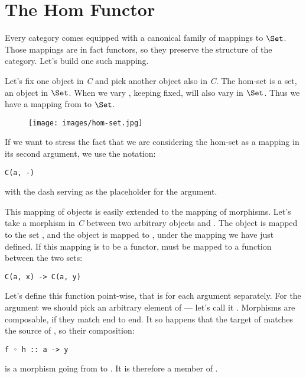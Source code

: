 \section{The Hom Functor}\label{the-hom-functor}

Every category comes equipped with a canonical family of mappings to
$\Set$. Those mappings are in fact functors, so they preserve the
structure of the category. Let's build one such mapping.

Let's fix one object  in \emph{C} and pick another object
 also in \emph{C}. The hom-set  is a set, an
object in $\Set$. When we vary , keeping 
fixed,  will also vary in $\Set$. Thus we have a
mapping from  to $\Set$.

\begin{figure}[H]
\centering
\texttt{[image: images/hom-set.jpg]}
\end{figure}

\noindent
If we want to stress the fact that we are considering the hom-set as a
mapping in its second argument, we use the notation:

\begin{Verbatim}[commandchars=\\\{\}]
C(a, -)
\end{Verbatim}
with the dash serving as the placeholder for the argument.

This mapping of objects is easily extended to the mapping of morphisms.
Let's take a morphism  in \emph{C} between two arbitrary
objects  and . The object  is mapped to
the set , and the object  is mapped to
, under the mapping we have just defined. If this
mapping is to be a functor,  must be mapped to a function
between the two sets:

\begin{Verbatim}[commandchars=\\\{\}]
C(a, x) -> C(a, y)
\end{Verbatim}
Let's define this function point-wise, that is for each argument
separately. For the argument we should pick an arbitrary element of
 --- let's call it . Morphisms are
composable, if they match end to end. It so happens that the target of
 matches the source of , so their composition:

\begin{Verbatim}[commandchars=\\\{\}]
f ◦ h :: a -> y
\end{Verbatim}
is a morphism going from  to . It is therefore a
member of .

